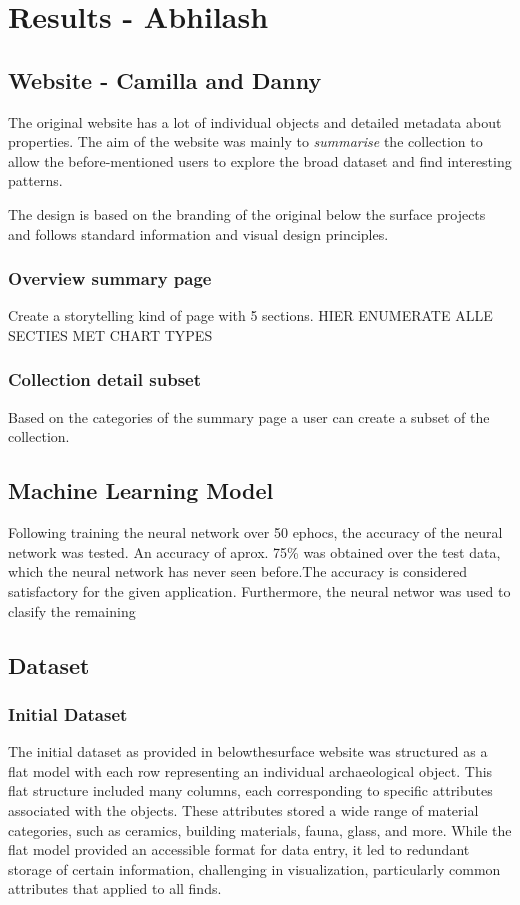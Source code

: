 \section{Results - Abhilash}

\subsection{Website - Camilla and Danny}

The original website has a lot of individual objects and detailed metadata about properties. The aim of the website was mainly to \textit{summarise} the collection to allow the before-mentioned users to explore the broad dataset and find interesting patterns.

The design is based on the branding of the original below the surface projects and follows standard information and visual design principles.

\subsubsection{Overview summary page}
Create a storytelling kind of page with 5 sections. HIER ENUMERATE ALLE SECTIES MET CHART TYPES

\subsubsection{Collection detail subset}
Based on the categories of the summary page a user can create a subset of the collection.

\subsection{Machine Learning Model}
Following training the neural network over 50 ephocs, the accuracy of the neural network was tested. An accuracy of aprox. 75\% was obtained over the test data, which the neural network has never seen before.The accuracy is considered satisfactory for the given application. Furthermore, the neural networ was used to clasify the remaining 

\subsection{Dataset}

\subsubsection{Initial Dataset}
The initial dataset as provided in belowthesurface website was structured as a flat model with each row representing an individual archaeological object. This flat structure included many columns, each corresponding to specific attributes associated with the objects. These attributes stored a wide range of material categories, such as ceramics, building materials, fauna, glass, and more. While the flat model provided an accessible format for data entry, it led to redundant storage of certain information, challenging in visualization, particularly common attributes that applied to all finds.

